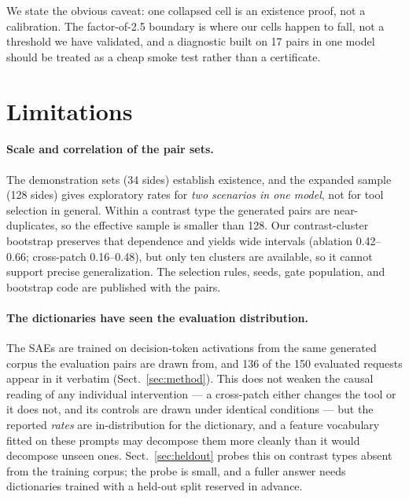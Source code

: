 \documentclass{article}
\begin{document}
We state the obvious caveat: one collapsed cell is an existence proof, not a calibration. The factor-of-2.5 boundary is where our cells happen to fall, not a threshold we have validated, and a diagnostic built on 17 pairs in one model should be treated as a cheap smoke test rather than a certificate.

\section{Limitations}
\label{sec:limitations}

\paragraph{Scale and correlation of the pair sets.} The demonstration sets (34 sides) establish existence, and the expanded sample (128 sides) gives exploratory rates for \emph{two scenarios in one model}, not for tool selection in general. Within a contrast type the generated pairs are near-duplicates, so the effective sample is smaller than 128. Our contrast-cluster bootstrap preserves that dependence and yields wide intervals (ablation 0.42--0.66; cross-patch 0.16--0.48), but only ten clusters are available, so it cannot support precise generalization. The selection rules, seeds, gate population, and bootstrap code are published with the pairs.

\paragraph{The dictionaries have seen the evaluation distribution.} The SAEs are trained on decision-token activations from the same generated corpus the evaluation pairs are drawn from, and 136 of the 150 evaluated requests appear in it verbatim (Sect.~\ref{sec:method}). This does not weaken the causal reading of any individual intervention --- a cross-patch either changes the tool or it does not, and its controls are drawn under identical conditions --- but the reported \emph{rates} are in-distribution for the dictionary, and a feature vocabulary fitted on these prompts may decompose them more cleanly than it would decompose unseen ones. Sect.~\ref{sec:heldout} probes this on contrast types absent from the training corpus; the probe is small, and a fuller answer needs dictionaries trained with a held-out split reserved in advance.
\end{document}
